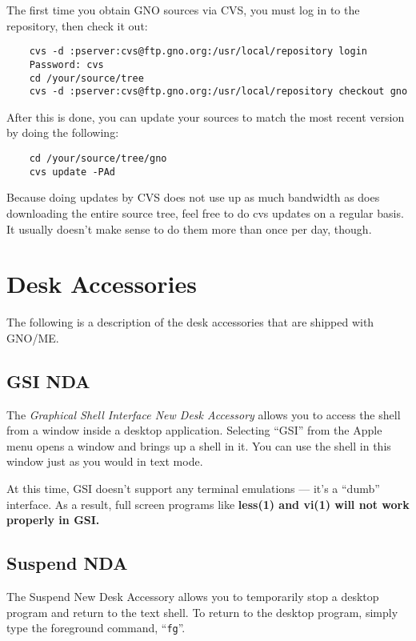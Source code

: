 \documentclass{report}
\begin{document}
The first time you obtain GNO sources via CVS, you must log in to the
repository, then check it out:

\begin{verbatim}
	cvs -d :pserver:cvs@ftp.gno.org:/usr/local/repository login
	Password: cvs
	cd /your/source/tree
	cvs -d :pserver:cvs@ftp.gno.org:/usr/local/repository checkout gno
\end{verbatim}

After this is done, you can update your sources to match the most recent
version by doing the following:

\begin{verbatim}
	cd /your/source/tree/gno
	cvs update -PAd
\end{verbatim}

Because doing updates by CVS does not use up as much bandwidth as 
does downloading the entire source tree, feel free to do cvs updates
on a regular basis.  It usually doesn't make sense to do them more
than once per day, though.

\chapter{Desk Accessories}

The following is a description of the desk
accessories that are shipped with GNO/ME.

\section{GSI NDA}

The \textit{Graphical Shell Interface New Desk Accessory}
allows you to access the shell from a window inside a
desktop application. Selecting ``GSI'' from the Apple menu opens a
window and brings up a shell in it. You can use the shell in this
window just as you would in text mode.

At this time, GSI doesn't support any
terminal emulations --- it's a ``dumb'' interface. As a result,
full screen programs like \bf less\rm(1) and \bf vi\rm(1) will not
work properly in GSI.

\section{Suspend NDA}

The Suspend New Desk Accessory allows you
to temporarily stop a desktop program and return to the text
shell. To return to the desktop program, simply type the foreground
command, ``\texttt{fg}''.
\end{document}
